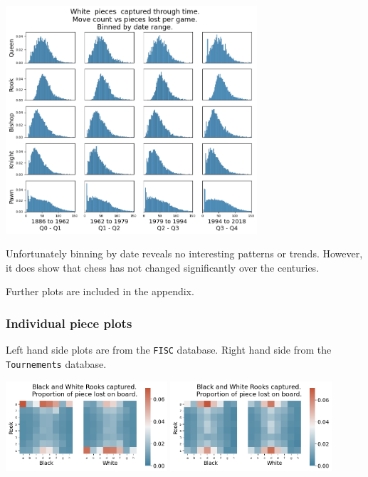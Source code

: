 \documentclass[11pt]{article}
\begin{document}
\begin{center}
\includegraphics[width=0.7\textwidth]{Images/_HIST_Queen_Rook_Bishop_Knight_Pawn_WHITE_DATE_TOURNEMENTS.png}
\end{center}

Unfortunately binning by date reveals no interesting patterns or trends. However, it does show that chess has not changed significantly over the centuries.

Further plots are included in the appendix.

\subsubsection{Individual piece plots}
\label{sec:org6ba02a5}
Left hand side plots are from the \texttt{FISC} database. Right hand side from the \texttt{Tournements} database.
\begin{center}
\includegraphics[width=0.45\textwidth]{Images/_HEATMAP_Rook_FISC.png}
\includegraphics[width=0.45\textwidth]{Images/_HEATMAP_Rook_TOURNEMENTS.png}
\end{center}
\end{document}
